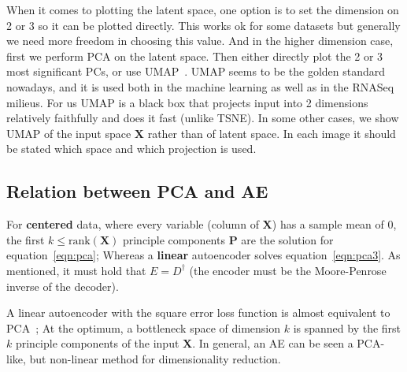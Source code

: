 \documentclass[11pt, a4paper]{report}
\theoremstyle{plain}
\theoremstyle{definition}
\theoremstyle{remark}
\newcommand{\X}{\mathbf{X}}
\newcommand{\bv}[1]{\boldsymbol{#1}}
\begin{document}
When it comes to plotting the latent space, one option is to set the dimension
on 2 or 3 so it can be plotted directly. This works ok for some datasets but
generally we need more freedom in choosing this value.
And in the higher dimension case, first we perform PCA on the latent space. Then
either directly plot the 2 or 3 most significant PCs, or use
UMAP~\cite{mcinnes2018umap}. UMAP seems to be the golden standard nowadays,
and it is used both in the machine learning as well as in the RNASeq
milieus.
For us UMAP is a black box that projects input into 2 dimensions relatively
faithfully and does it fast (unlike TSNE). 
In some other cases, we show UMAP of the input space $\X$ rather than of latent
space. In each image it should be stated which space and which projection is
used.

\subsection{Relation between PCA and AE}
For \textbf{centered} data, where every variable (column of $\bv{X}$)
has a sample mean of $0$, the first $k \leq \text{rank}(\bv{X})$ principle components
$\bv{P}$ are the solution for equation~\ref{eqn:pca}; Whereas a \textbf{linear}
autoencoder solves equation~\ref{eqn:pca3}. As mentioned, it must hold that $E =
D^{\dagger}$ (the encoder must be the Moore-Penrose inverse of the decoder).

A linear autoencoder with the  square error
loss function is almost equivalent to
PCA~\cite{plaut2018principal}; At the optimum, a bottleneck space of dimension $k$
is spanned by the first $k$ principle components of the input $\bv{X}$.
In general, an AE can be seen a PCA-like, but non-linear method for
dimensionality reduction.
\end{document}
